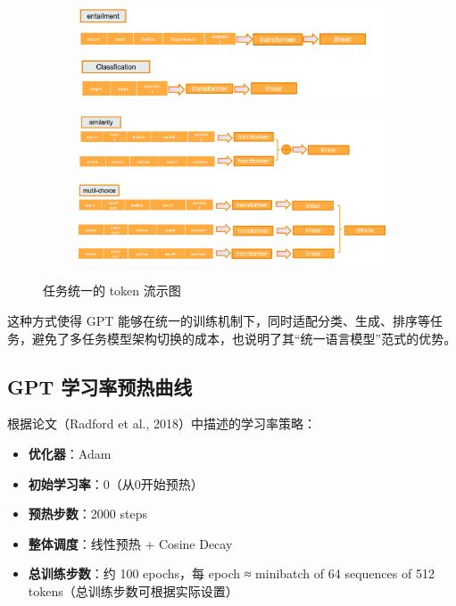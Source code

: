 \documentclass[a4paper,12pt]{article}
\begin{document}
\begin{figure}[H]
    \begin{subfigure}[b]{0.5\textwidth}
        \includegraphics[width=\textwidth]{image/image2.png}
        \caption{}
    \end{subfigure}
    \hfill
    \begin{subfigure}[b]{0.5\textwidth}
        \includegraphics[width=\textwidth]{image/image3.png}
        \caption{}
    \end{subfigure}
    \caption{任务统一的 token 流示图}
\end{figure}

这种方式使得 GPT 能够在统一的训练机制下，同时适配分类、生成、排序等任务，避免了多任务模型架构切换的成本，也说明了其“统一语言模型”范式的优势。


\subsection{GPT 学习率预热曲线}

根据论文（Radford et al., 2018）中描述的学习率策略：


\begin{itemize}
    \item \textbf{优化器}：Adam
    \item \textbf{初始学习率}：0（从0开始预热）
    \item \textbf{预热步数}：2000 steps
    \item \textbf{整体调度}：线性预热 + Cosine Decay
    \item \textbf{总训练步数}：约 100 epochs，每 epoch ≈ minibatch of 64 sequences of 512 tokens（总训练步数可根据实际设置）
\end{itemize}
\end{document}
